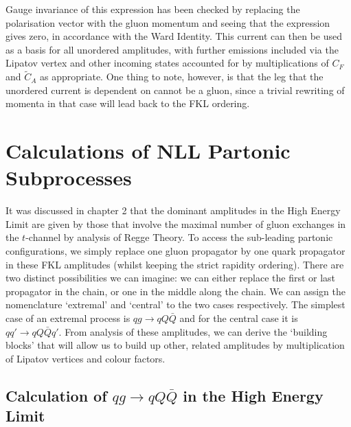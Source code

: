 Gauge invariance of this expression has been checked by replacing the polarisation vector with the gluon momentum and seeing that the expression gives zero, in accordance with the Ward Identity. This current can then be used as a basis for all unordered amplitudes, with further emissions included via the Lipatov vertex and other incoming states accounted for by multiplications of $C_F$ and $\tilde{C}_A$ as appropriate. One thing to note, however, is that the leg that the unordered current is dependent on cannot be a gluon, since a trivial rewriting of momenta in that case will lead back to the FKL ordering. 

\section{Calculations of NLL Partonic Subprocesses}

It was discussed in chapter 2 that the dominant amplitudes in the High Energy Limit are given by those that involve the maximal number of gluon exchanges in the $t$-channel by analysis of Regge Theory. To access the sub-leading partonic configurations, we simply replace one gluon propagator by one quark propagator in these FKL amplitudes (whilst keeping the strict rapidity ordering). There are two distinct possibilities we can imagine: we can either replace the first or last propagator in the chain, or one in the middle along the chain. We can assign the nomenclature `extremal' and `central' to the two cases respectively. The simplest case of an extremal process is $qg \to qQ\bar{Q}$ and for the central case it is $qq' \to qQ\bar{Q}q'$. From analysis of these amplitudes, we can derive the `building blocks' that will allow us to build up other, related amplitudes by multiplication of Lipatov vertices and colour factors. 

\subsection{Calculation of $qg \to qQ\bar{Q}$ in the High Energy Limit}

